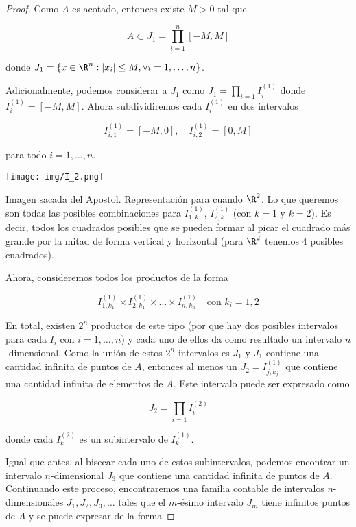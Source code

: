 \begin{proof}
    Como $A$ es acotado, entonces existe $M > 0$ tal que
    
    \[
    A \subset J_1 = \prod_{i=1}^n [-M,M]
    \]
    
    \noindent donde $J_1 = \{x \in \R^n : |x_i| \leq M, \forall i = 1, \dots, n\}$.
    
    Adicionalmente, podemos considerar a $J_1$ como $J_1 = \prod_{i=1} I_i^{(1)}$ donde $I_i^{(1)} = [-M,M]$. Ahora subdividiremos cada $I_i^{(1)}$ en dos intervalos
    
    \[
    I_{i,1}^{(1)} = [-M,0], \quad I_{i,2}^{(1)} = [0, M]
    \]
    
    \noindent para todo $i = 1, \dots, n$.
    
    \begin{marginfigure}
        \centering
        \texttt{[image: img/I\_2.png]}
        \caption{\footnotesize{Imagen sacada del Apostol. Representación para cuando $\R^2$. Lo que queremos son todas las posibles combinaciones para $I_{1,k}^{(1)}$, $I_{2,k}^{(1)}$ (con $k=1$ y $k=2$). Es decir, todos los cuadrados posibles que se pueden formar al picar el cuadrado más grande por la mitad de forma vertical y horizontal (para $\R^2$ tenemos 4 posibles cuadrados).}}
        \label{fig:R^2}
    \end{marginfigure}
    
    Ahora, consideremos todos los productos de la forma
    
    \[
    I_{1,k_1}^{(1)} \times I_{2,k_1}^{(1)} \times \dots \times I_{n,k_n}^{(1)} \quad \text{con $k_i=1,2$}
    \]
    
    En total, existen $2^n$ productos de este tipo (por que hay dos posibles intervalos para cada $I_i$ con $i = 1, \dots, n$) y cada uno de ellos da como resultado un intervalo $n$-dimensional. Como la unión de estos $2^n$ intervalos es $J_1$ y $J_1$ contiene una cantidad infinita de puntos de $A$, entonces al menos un $J_2 = I_{j, k_j}^{(1)}$ que contiene una cantidad infinita de elementos de $A$. Este intervalo puede ser expresado como
    
    \[
    J_2 = \prod_{i=1} I_i^{(2)}
    \]
    
    \noindent donde cada $I_k^{(2)}$ es un subintervalo de $I_k^{(1)}$.
    
    Igual que antes, al bisecar cada uno de estos subintervalos, podemos encontrar un intervalo $n$-dimensional $J_3$ que contiene una cantidad infinita de puntos de $A$. Continuando este proceso, encontraremos una familia contable de intervalos $n$-dimensionales $J_1, J_2, J_3, \dots$ tales que el $m$-ésimo intervalo $J_m$ tiene infinitos puntos de $A$ y se puede expresar de la forma
    

\end{proof}
